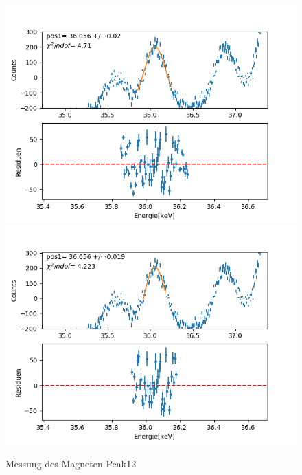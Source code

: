 \documentclass[12pt,a4paper]{article}
\begin{document}
\begin{figure}[H]
\centering
\includegraphics[scale=0.49]{Bilder/roentgen_spektren/magnet/mag12_1.png}
\includegraphics[scale=0.49]{Bilder/roentgen_spektren/magnet/mag12_2.png}
\caption{Messung des Magneten Peak12}
\end{figure}
\end{document}
